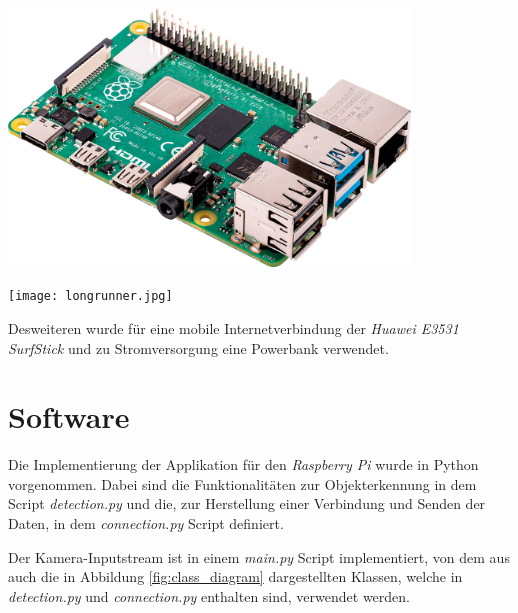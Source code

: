 \vspace{1cm}
\begin{minipage}{0.55\textwidth}
    \centering
    \includegraphics[width=0.8\textwidth]
    {./Bilder/raspberrypi_4.png}
    \label{fig:raspberrypi}
\end{minipage}
\begin{minipage}{0.45\textwidth}
    \centering
    \texttt{[image: longrunner.jpg]}
    \label{fig:rpicam}
\end{minipage}
\vspace{1cm}


Desweiteren wurde für eine mobile Internetverbindung 
der \textit{Huawei E3531 SurfStick} und zu
 Stromversorgung eine Powerbank verwendet.



\section{Software}

Die Implementierung der Applikation für den \textit{Raspberry Pi}
wurde in Python vorgenommen. 
Dabei sind die Funktionalitäten zur Objekterkennung in
dem Script \textit{detection.py} 
und die, zur Herstellung einer Verbindung
und Senden der Daten, in dem 
\textit{connection.py} Script definiert.


Der Kamera-Inputstream ist in einem \textit{main.py} Script 
implementiert, von dem aus auch die in Abbildung 
\ref{fig:class_diagram} 
dargestellten Klassen, welche in \textit{detection.py}
und \textit{connection.py} enthalten sind,
verwendet werden.
\vspace{1cm}

